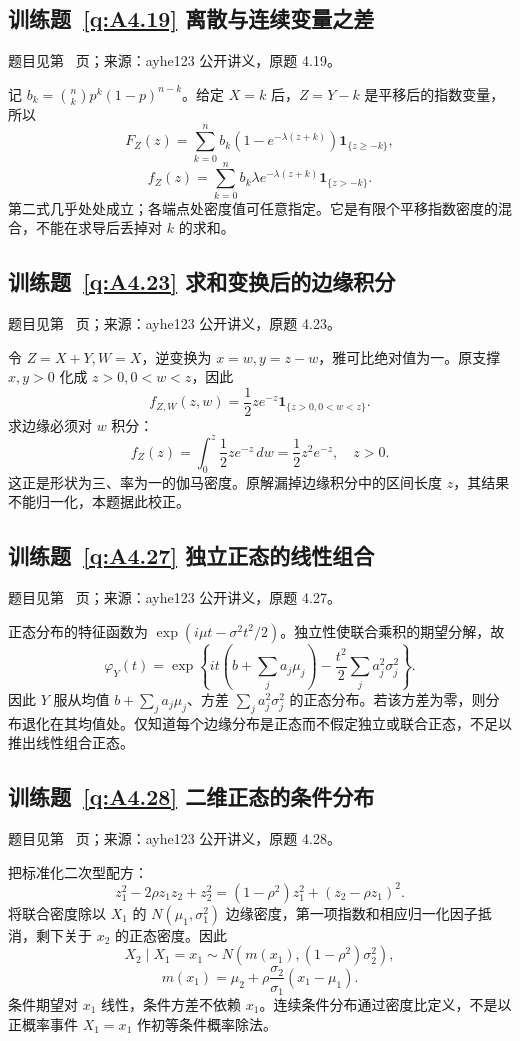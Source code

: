 \documentclass[UTF8,12pt,a4paper,fontset=fandol]{ctexbook}
\begin{document}
\subsection*{训练题~\ref{q:A4.19} 离散与连续变量之差}\label{a:A4.19}{\small 题目见第~\pageref{q:A4.19} 页；来源：ayhe123 公开讲义，原题 4.19。}
\begin{solve}记 $b_k=\binom nkp^k(1-p)^{n-k}$。给定 $X=k$ 后，$Z=Y-k$ 是平移后的指数变量，所以\[F_Z(z)=\sum_{k=0}^n b_k(1-e^{-\lambda(z+k)})\mathbf1_{\{z\ge-k\}},\]\[f_Z(z)=\sum_{k=0}^n b_k\lambda e^{-\lambda(z+k)}\mathbf1_{\{z>-k\}}.\]第二式几乎处处成立；各端点处密度值可任意指定。它是有限个平移指数密度的混合，不能在求导后丢掉对 $k$ 的求和。\end{solve}

\subsection*{训练题~\ref{q:A4.23} 求和变换后的边缘积分}\label{a:A4.23}{\small 题目见第~\pageref{q:A4.23} 页；来源：ayhe123 公开讲义，原题 4.23。}
\begin{solve}令 $Z=X+Y,W=X$，逆变换为 $x=w,y=z-w$，雅可比绝对值为一。原支撑 $x,y>0$ 化成 $z>0,0<w<z$，因此\[f_{Z,W}(z,w)=\frac12ze^{-z}\mathbf1_{\{z>0,0<w<z\}}.\]求边缘必须对 $w$ 积分：\[f_Z(z)=\int_0^z\frac12ze^{-z}\,dw=\frac12z^2e^{-z},\quad z>0.\]这正是形状为三、率为一的伽马密度。原解漏掉边缘积分中的区间长度 $z$，其结果不能归一化，本题据此校正。\end{solve}

\subsection*{训练题~\ref{q:A4.27} 独立正态的线性组合}\label{a:A4.27}{\small 题目见第~\pageref{q:A4.27} 页；来源：ayhe123 公开讲义，原题 4.27。}
\begin{solve}正态分布的特征函数为 $\exp(i\mu t-\sigma^2t^2/2)$。独立性使联合乘积的期望分解，故\[\varphi_Y(t)=\exp\left\{it\left(b+\sum_ja_j\mu_j\right)-\frac{t^2}{2}\sum_ja_j^2\sigma_j^2\right\}.\]因此 $Y$ 服从均值 $b+\sum_ja_j\mu_j$、方差 $\sum_ja_j^2\sigma_j^2$ 的正态分布。若该方差为零，则分布退化在其均值处。仅知道每个边缘分布是正态而不假定独立或联合正态，不足以推出线性组合正态。\end{solve}

\subsection*{训练题~\ref{q:A4.28} 二维正态的条件分布}\label{a:A4.28}{\small 题目见第~\pageref{q:A4.28} 页；来源：ayhe123 公开讲义，原题 4.28。}
\begin{solve}把标准化二次型配方：\[z_1^2-2\rho z_1z_2+z_2^2=(1-\rho^2)z_1^2+(z_2-\rho z_1)^2.\]将联合密度除以 $X_1$ 的 $N(\mu_1,\sigma_1^2)$ 边缘密度，第一项指数和相应归一化因子抵消，剩下关于 $x_2$ 的正态密度。因此\[X_2\mid X_1=x_1\sim N(m(x_1),(1-\rho^2)\sigma_2^2),\]\[m(x_1)=\mu_2+\rho\frac{\sigma_2}{\sigma_1}(x_1-\mu_1).\]条件期望对 $x_1$ 线性，条件方差不依赖 $x_1$。连续条件分布通过密度比定义，不是以正概率事件 $X_1=x_1$ 作初等条件概率除法。\end{solve}
\end{document}
